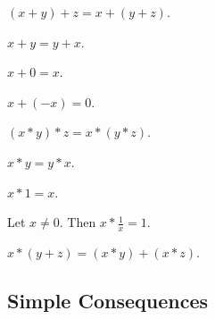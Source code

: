 \documentclass{article}
\begin{document}
\begin{forthel}

\begin{axiom} $(x + y) + z = x + (y + z)$.
\end{axiom}

\begin{axiom} $x + y = y + x$.
\end{axiom}

\begin{axiom} $x + 0 = x$.
\end{axiom}

\begin{axiom} $x + (-x) = 0$.
\end{axiom}

\begin{axiom} $(x * y) * z = x * (y * z)$.
\end{axiom}

\begin{axiom} $x * y = y * x$.
\end{axiom}

\begin{axiom} $x * 1 = x$.
\end{axiom}

\begin{axiom} Let $x \neq 0$. Then $x * \frac{1}{x} = 1$.
\end{axiom}

\begin{axiom} $x * (y + z) = (x * y) + (x * z)$.
\end{axiom}

\end{forthel}

\subsection*{Simple Consequences}
\end{document}
